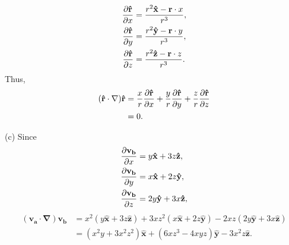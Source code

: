 \begin{sol}[1.22]
                \begin{equation}
                    \begin{aligned}
                        \frac{\partial \mathbf{\hat{r}}}{\partial x} &= \frac{r^2\mathbf{\hat{x}}-\mathbf{r}\cdot x}{r^3}, \\
                        \frac{\partial \mathbf{\hat{r}}}{\partial y} &= \frac{r^2\mathbf{\hat{y}}-\mathbf{r}\cdot y}{r^3}, \\
                        \frac{\partial \mathbf{\hat{r}}}{\partial z} &= \frac{r^2\mathbf{\hat{z}}-\mathbf{r}\cdot z}{r^3}.
                    \end{aligned}
                \end{equation}
                    Thus,
                \begin{equation}
                    \begin{aligned}
                    (\mathbf{\hat{r}} \cdot \nabla)\mathbf{\hat{r}} &= \frac{x}{r} \frac{\partial \mathbf{\hat{r}}}{\partial x} + \frac{y}{r} \frac{\partial \mathbf{\hat{r}}}{\partial y} + \frac{z}{r}\frac{\partial \mathbf{\hat{r}}}{\partial z}\\
                        &=0.
                    \end{aligned}
                \end{equation}

                \noindent (c) Since
                \begin{equation}
                    \begin{aligned}
                        \frac{\partial \mathbf{v_b}}{\partial x} &=y\mathbf{\hat{x}} + 3z\mathbf{\hat{z}}, \\
                        \frac{\partial \mathbf{v_b}}{\partial y} &=x\mathbf{\hat{x}} + 2z\mathbf{\hat{y}}, \\
                        \frac{\partial \mathbf{v_b}}{\partial z} &=2y\mathbf{\hat{y}} + 3x \mathbf{\hat{z}},
                    \end{aligned}
                \end{equation}
                \begin{equation}
                    \begin{aligned}
                            (\mathbf{v_a\cdot\nabla})\mathbf{v_b} &= x^2(y\mathbf{\hat{x}} + 3z\mathbf{\hat{z}})
                                +3xz^2(x\mathbf{\hat{x}} + 2z\mathbf{\hat{y}})
                                -2xz(2y\mathbf{\hat{y}} + 3x\mathbf{\hat{z}}) \\
                            &=(x^2y + 3x^2z^2)\mathbf{\hat{x}} + (6xz^3 - 4xyz)\mathbf{\hat{y}} -3x^2z\mathbf{\hat{z}}.
                    \end{aligned}
                \end{equation}
            \end{sol}

